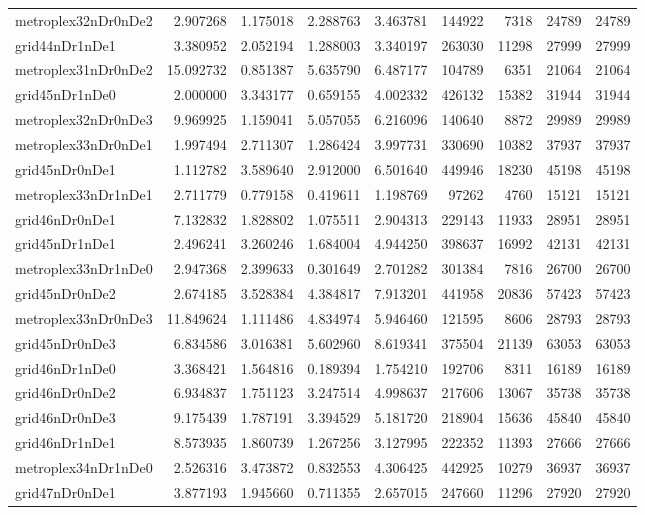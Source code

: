 \begin{longtable}{|l|r|r|r|r|r|r|r|r|}
metroplex32nDr0nDe2 & 2.907268 & 1.175018 & 2.288763 & 3.463781 & 144922 & 7318 & 24789 & 24789 \\
grid44nDr1nDe1 & 3.380952 & 2.052194 & 1.288003 & 3.340197 & 263030 & 11298 & 27999 & 27999 \\
metroplex31nDr0nDe2 & 15.092732 & 0.851387 & 5.635790 & 6.487177 & 104789 & 6351 & 21064 & 21064 \\
grid45nDr1nDe0 & 2.000000 & 3.343177 & 0.659155 & 4.002332 & 426132 & 15382 & 31944 & 31944 \\
metroplex32nDr0nDe3 & 9.969925 & 1.159041 & 5.057055 & 6.216096 & 140640 & 8872 & 29989 & 29989 \\
metroplex33nDr0nDe1 & 1.997494 & 2.711307 & 1.286424 & 3.997731 & 330690 & 10382 & 37937 & 37937 \\
grid45nDr0nDe1 & 1.112782 & 3.589640 & 2.912000 & 6.501640 & 449946 & 18230 & 45198 & 45198 \\
metroplex33nDr1nDe1 & 2.711779 & 0.779158 & 0.419611 & 1.198769 & 97262 & 4760 & 15121 & 15121 \\
grid46nDr0nDe1 & 7.132832 & 1.828802 & 1.075511 & 2.904313 & 229143 & 11933 & 28951 & 28951 \\
grid45nDr1nDe1 & 2.496241 & 3.260246 & 1.684004 & 4.944250 & 398637 & 16992 & 42131 & 42131 \\
metroplex33nDr1nDe0 & 2.947368 & 2.399633 & 0.301649 & 2.701282 & 301384 & 7816 & 26700 & 26700 \\
grid45nDr0nDe2 & 2.674185 & 3.528384 & 4.384817 & 7.913201 & 441958 & 20836 & 57423 & 57423 \\
metroplex33nDr0nDe3 & 11.849624 & 1.111486 & 4.834974 & 5.946460 & 121595 & 8606 & 28793 & 28793 \\
grid45nDr0nDe3 & 6.834586 & 3.016381 & 5.602960 & 8.619341 & 375504 & 21139 & 63053 & 63053 \\
grid46nDr1nDe0 & 3.368421 & 1.564816 & 0.189394 & 1.754210 & 192706 & 8311 & 16189 & 16189 \\
grid46nDr0nDe2 & 6.934837 & 1.751123 & 3.247514 & 4.998637 & 217606 & 13067 & 35738 & 35738 \\
grid46nDr0nDe3 & 9.175439 & 1.787191 & 3.394529 & 5.181720 & 218904 & 15636 & 45840 & 45840 \\
grid46nDr1nDe1 & 8.573935 & 1.860739 & 1.267256 & 3.127995 & 222352 & 11393 & 27666 & 27666 \\
metroplex34nDr1nDe0 & 2.526316 & 3.473872 & 0.832553 & 4.306425 & 442925 & 10279 & 36937 & 36937 \\
grid47nDr0nDe1 & 3.877193 & 1.945660 & 0.711355 & 2.657015 & 247660 & 11296 & 27920 & 27920 \\

\end{longtable}
